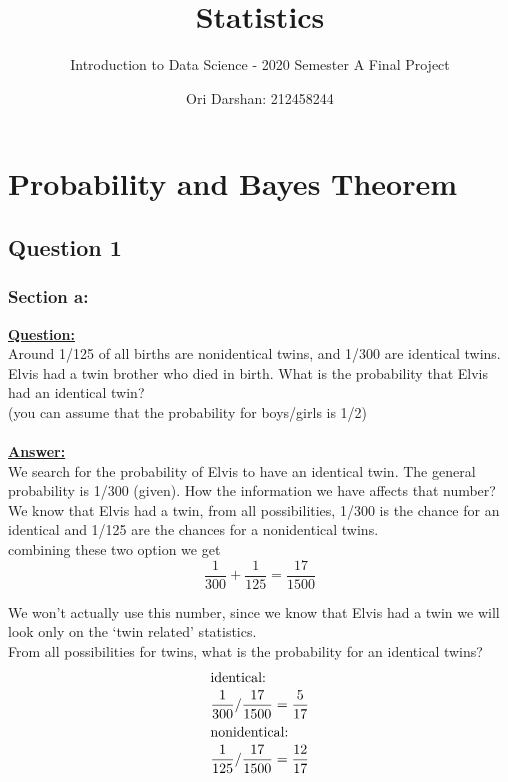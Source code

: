 \documentclass[a4, 12pt,titlepage]{scrartcl}
\title{Statistics}
\subtitle{Introduction to Data Science - 2020 Semester A Final Project}
\author{Ori Darshan: 212458244}
\date{}
\begin{document}
\maketitle

\bigskip
\section{Probability and Bayes Theorem}
\subsection{Question 1}
\subsubsection{Section a:}
\textbf{\underline{Question:}}\\
Around 1/125 of all births are nonidentical twins, and 1/300 are identical twins. Elvis had a twin brother who died in birth. What is the probability that Elvis had an identical twin?\\
(you can assume that the probability for boys/girls is 1/2)\\\smallskip\\
\textbf{\underline{Answer:}}\\
We search for the probability of Elvis to have an identical twin.
The general probability is 1/300 (given). How the information we have affects that number?\\
We know that Elvis had a twin, from all possibilities, 1/300 is the chance for an identical and 1/125 are the chances for a nonidentical twins.\\
combining these two option we get\[
\frac{1}{300}+\frac{1}{125}=\frac{17}{1500}
\]

We won't actually use this number, since we know that Elvis had a twin we will look only on the `twin related' statistics.\\
From all possibilities for twins, what is the probability for an identical twins?\begin{align*}
\intertext{identical:}
\frac{1}{300}/\frac{17}{1500}&=\frac{5}{17}\\
\intertext{nonidentical:}
\frac{1}{125}/\frac{17}{1500}&=\frac{12}{17}\\
\end{align*}
\end{document}
